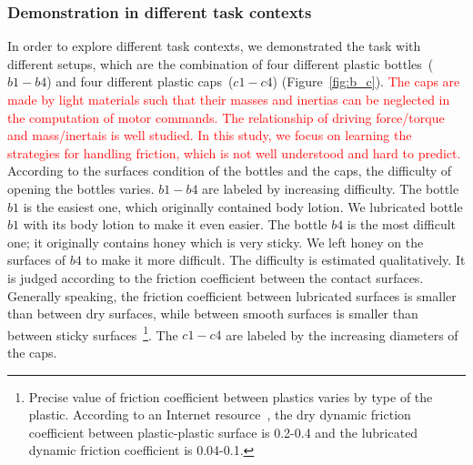 \subsubsection{Demonstration in different task contexts}
\label{sec:exp_context}
In order to explore
different task contexts, we demonstrated the task with different
setups, which are the combination of four different plastic
bottles~($b1-b4$) and four different plastic caps~($c1-c4$)
(Figure~\ref{fig:b_c}). \textcolor{red}{The caps are made by light materials such that their masses and inertias can be neglected in the computation of motor commands.  The relationship of driving force/torque and mass/inertais is well studied. In this study, we focus on learning the strategies for handling friction, which is not well understood and hard to predict.} According to the surfaces condition of the
bottles and the caps, the difficulty of opening the bottles
varies. $b1-b4$ are labeled by increasing difficulty. The bottle $b1$
is the easiest one, which originally contained body lotion. We
lubricated bottle $b1$ with its body lotion to make it even easier. The
bottle $b4$ is the most difficult one; it originally contains honey
which is very sticky. We left honey on the surfaces of $b4$ to make
it more difficult. The difficulty is estimated qualitatively. It is
judged according to the friction coefficient between the contact
surfaces. Generally speaking, the friction coefficient between
lubricated surfaces is smaller than between dry surfaces, while
between smooth surfaces is smaller than between sticky
surfaces~\footnote{Precise value of friction coefficient between
  plastics varies by type of the plastic. According to an Internet
  resource~\citep{FOC}, the dry dynamic friction coefficient between
  plastic-plastic surface is 0.2-0.4 and the lubricated dynamic
  friction coefficient is 0.04-0.1.}. The $c1-c4$ are labeled by the increasing diameters of the caps.



